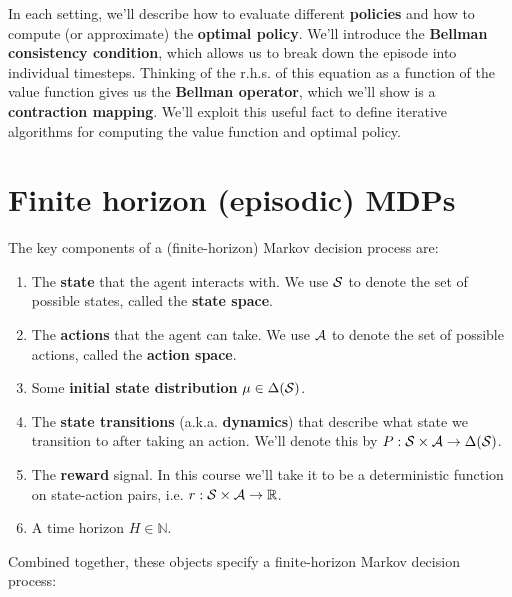 \documentclass[../main/main]{subfiles}
\begin{document}
In each setting, we'll describe how to evaluate different \textbf{policies} and how to compute (or approximate) the \textbf{optimal policy}. We'll introduce the \textbf{Bellman consistency condition}, which allows us to break down the episode into individual timesteps. Thinking of the r.h.s. of this equation as a function of the value function gives us the \textbf{Bellman operator}, which we'll show is a \textbf{contraction mapping}. We'll exploit this useful fact to define iterative algorithms for computing the value function and optimal policy.

\section{Finite horizon (episodic) MDPs}

The key components of a (finite-horizon) Markov decision process are:

\begin{enumerate}
    \item The \textbf{state} that the agent interacts with. We use $\S$ to denote the set of possible states, called the \textbf{state space}.
    \item The \textbf{actions} that the agent can take. We use $\A$ to denote the set of possible actions, called the \textbf{action space}.
    \item Some \textbf{initial state distribution} $\mu \in \Delta(\S)$.
    \item The \textbf{state transitions} (a.k.a. \textbf{dynamics}) that describe what state we transition to after taking an action. We'll denote this by $P : \S \times \A \to \Delta(\S)$. %
    \item The \textbf{reward} signal. In this course we'll take it to be a deterministic function on state-action pairs, i.e. $r : \S \times \A \to \mathbb{R}$. %
    \item A time horizon $H \in \mathbb{N}$.
\end{enumerate}

Combined together, these objects specify a finite-horizon Markov decision process:
\end{document}
